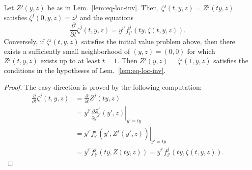 \begin{lemma} \label{lem:eq-radial}
Let $Z^j(y,z)$ be as in Lem.~\ref{lem:eq-loc-inv}. Then, $\zeta^j(t,y,z) =
Z^j(ty,z)$ satisfies $\zeta^j(0,y,z) = z^j$ and the equations
\[
  \frac{\partial}{\partial t} \zeta^j(t,y,z) = y^{i'} f_{i'}^j(ty,\zeta(t,y,z)) .
\]
Conversely, if $\zeta^j(t,y,z)$ satisfies the initial value problem above, then
there exists a sufficiently small neighborhood of $(y,z)=(0,0)$ for which
$Z^j(t,y,z)$ exists up to at least $t=1$. Then $Z^j(y,z) = \zeta^j(1,y,z)$
satisfies the conditions in the hypotheses of Lem.~\ref{lem:eq-loc-inv}.
\end{lemma}
\begin{proof}
The easy direction is proved by the following computation:
\begin{align*}
  \frac{\partial}{\partial t} \zeta^j(t,y,z)
  &= \frac{\partial}{\partial t} Z^j(ty,z)
  \\
  &= y^{i'} \left.\frac{\partial Z^j}{\partial y'^{i'}}(y',z) \right|_{y'=ty}
  \\
  &= y^{i'} \left.f_{i'}^j(y',Z^j(y',z)) \right|_{y'=ty}
  \\
  &= y^{i'} f_{i'}^j(ty,Z(ty,z))
  = y^{i'} f_{i'}^j(ty, \zeta(t,y,z)) .
\end{align*}


\end{proof}
